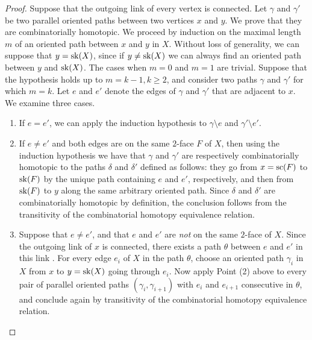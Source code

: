\begin{proof}

    Suppose that the outgoing link of every vertex is  connected. 
    Let $\gamma$ and $\gamma'$ be two parallel oriented paths between two vertices $x$ and $y$. 
    We prove that they are combinatorially homotopic. 
    We proceed by induction on the maximal length $m$ of an oriented path between $x$ and $y$ in $X$. 
    Without loss of generality, we can suppose that $y=\mathrm{sk}(X)$, since if $y\neq\mathrm{sk}(X)$ we can always find an oriented path between $y$ and $\mathrm{sk}(X)$.
    The cases when $m=0$ and $m=1$ are trivial. 
    Suppose that the hypothesis holds up to $m=k-1, k\geq 2$, and consider two paths $\gamma$ and $\gamma'$ for which $m=k$. 
    Let $e$ and $e'$ denote the edges of $\gamma$ and $\gamma'$ that are adjacent to $x$. 
    We examine three cases.
    \begin{enumerate}
        \item If $e=e'$, we can apply the induction hypothesis to $\gamma \setminus e$ and $\gamma' \setminus e'$. 
        \item If $e \neq e'$ and both edges are on the same $2$-face $F$ of $X$, then using the induction hypothesis we have that $\gamma$ and $\gamma'$ are respectively combinatorially homotopic to the paths $\delta$ and $\delta'$ defined as follows: they go from $x=\mathrm{sc}(F)$ to $\mathrm{sk}(F)$ by the unique path containing $e$ and $e'$, respectively, and then from $\mathrm{sk}(F)$ to $y$ along the same arbitrary oriented path. 
        Since $\delta$ and $\delta'$ are combinatorially homotopic by definition, the conclusion follows from the transitivity of the combinatorial homotopy equivalence relation. 
        \item Suppose that $e\neq e'$, and that $e$ and $e'$ are \emph{not} on the same $2$-face of $X$. 
        Since the outgoing link of $x$ is  connected, there exists a  path $\theta$ between  $e$ and $e'$ in this link . 
        For every edge $e_i$ of $X$ in the path $\theta$, choose an oriented path $\gamma_i$ in $X$ from $x$ to $y=\mathrm{sk}(X)$ going through $e_i$. 
        Now apply Point (2) above to every pair of parallel oriented paths $(\gamma_i, \gamma_{i+1})$ with $e_i$ and $e_{i+1}$ consecutive in $\theta$, and conclude again by transitivity of the combinatorial homotopy equivalence relation. 
    \end{enumerate}


\end{proof}
